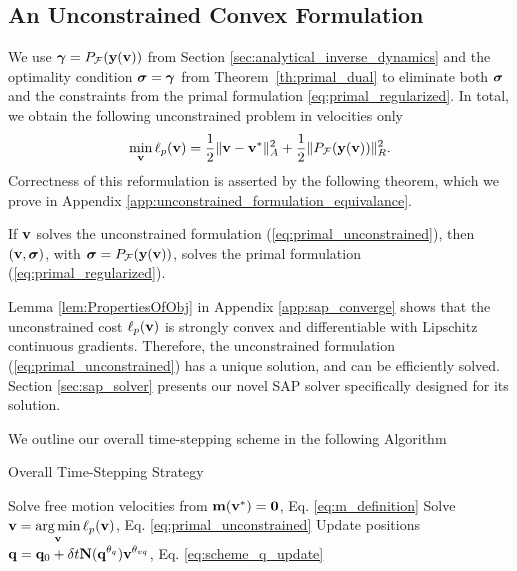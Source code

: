 
\subsection{An Unconstrained Convex Formulation}
\label{sec:unconstrained_convex_formulation}

We use ${\bm\gamma} = P_{\mathcal{F}}({\mathbf{y}}({\mathbf{v}}))$ from Section
\ref{sec:analytical_inverse_dynamics} and the optimality condition ${\bm{\sigma}}
= {\bm\gamma}$ from Theorem~\ref{th:primal_dual} to eliminate both ${\bm{\sigma}}$ and
the constraints from the primal formulation \eqref{eq:primal_regularized}. In
total, we obtain the following unconstrained problem in velocities only
\begin{eqnarray}
	\min_{\mf{v}} \ell_p(\mf{v}) = \frac{1}{2}\Vert\mf{v}-\mf{v}^*\Vert_{A}^2 +
	\frac{1}{2}\Vert P_\mathcal{F}(\mf{y}(\mf{v}))\Vert_R^2.
	\label{eq:primal_unconstrained}
\end{eqnarray}
Correctness of this reformulation is asserted by the following theorem, which we
prove in Appendix \ref{app:unconstrained_formulation_equivalance}.
\begin{theorem}
  If  ${\mathbf{v}}$ solves the unconstrained formulation
    (\ref{eq:primal_unconstrained}), then $({\mathbf{v}}, {\bm\sigma})$, with ${\bm\sigma}
    =P_\mathcal{F}({\mathbf{y}}({\mathbf{v}}))$, solves the primal formulation
    (\ref{eq:primal_regularized}).
    \label{th:unconstrained_formulation_equivalance}
\end{theorem}
Lemma \ref{lem:PropertiesOfObj} in Appendix \ref{app:sap_converge} shows that
the unconstrained cost $\ell_p({\mathbf{v}})$ is strongly convex and differentiable
with Lipschitz continuous gradients. Therefore, the unconstrained formulation
(\ref{eq:primal_unconstrained}) has a unique solution, and can be efficiently
solved.  
Section \ref{sec:sap_solver} presents our novel SAP solver specifically designed
for its solution.

We outline our overall time-stepping scheme in the following Algorithm
\begin{algorithm}[H]
	\caption{Overall Time-Stepping Strategy}
	  \label{alg:sap_time_stepping}
	  \begin{algorithmic}[1]
		  \State Solve free motion velocities from
		  ${\mathbf{m}}({\mathbf{v}}^*)={\mathbf{0}}$, Eq. \eqref{eq:m_definition}
		  \State Solve $\displaystyle {\mathbf{v}} = \operatorname*{arg\,min}_{{\mathbf{v}}} \ell_p({\mathbf{v}})$, Eq. \eqref{eq:primal_unconstrained}
		  \State Update positions $\displaystyle {\mathbf{q}} = {\mathbf{q}}_0 + \delta
		  t{\mathbf{N}}({\mathbf{q}}^{\theta_{q}}){\mathbf{v}}^{\theta_{vq}}$, Eq. \eqref{eq:scheme_q_update}
	  \end{algorithmic}
\end{algorithm}

